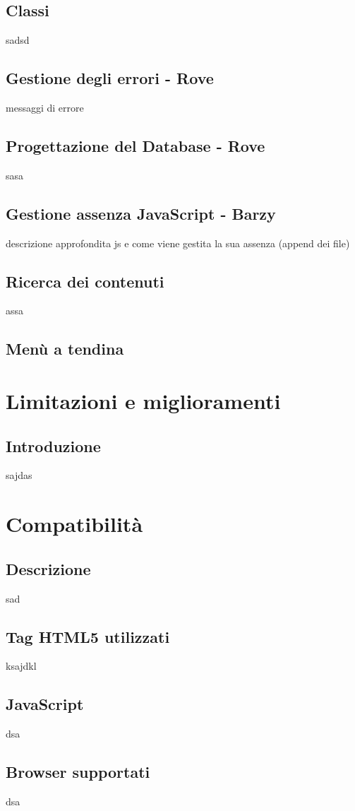 \documentclass[12pt]{article}
\begin{document}
	\subsection{Classi}
	sadsd
	\subsection{Gestione degli errori - Rove}
	messaggi di errore
	\subsection{Progettazione del Database - Rove}
	sasa
	\subsection{Gestione assenza JavaScript - Barzy}
	descrizione approfondita js e come viene gestita la sua assenza (append dei file)
	\subsection{Ricerca dei contenuti}
	assa
	\subsection{Menù a tendina}
	
	\section{Limitazioni e miglioramenti}
	\subsection{Introduzione}
	sajdas
	
	\section{Compatibilità}
	\subsection{Descrizione}
	sad
	\subsection{Tag HTML5 utilizzati}
	ksajdkl
	\subsection{JavaScript}
	dsa
	\subsection{Browser supportati}
	dsa
	
\end{document}
